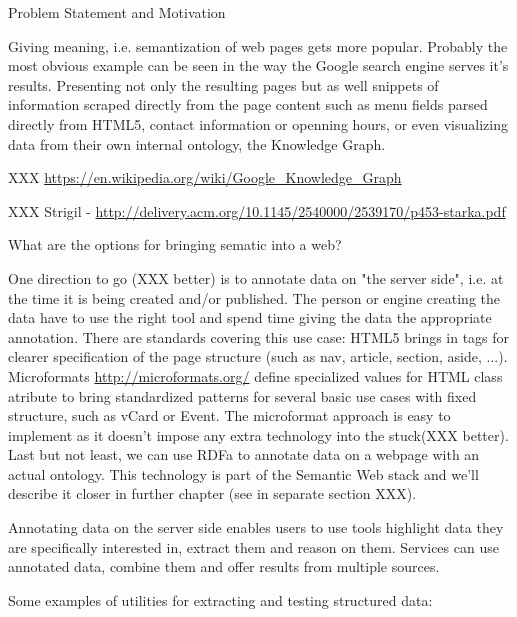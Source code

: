 \sec Problem Statement and Motivation

Giving meaning, i.e. semantization of web pages gets more popular. Probably the most
obvious example can be seen in the way the Google search engine serves it's
results. Presenting not only the resulting pages but as well snippets of
information scraped directly from the page content such as menu fields parsed
directly from HTML5, contact information or openning hours, or even visualizing
data from their own internal ontology, the Knowledge Graph. 

XXX \url{https://en.wikipedia.org/wiki/Google_Knowledge_Graph}

XXX Strigil - \url{http://delivery.acm.org/10.1145/2540000/2539170/p453-starka.pdf}

What are the options for bringing sematic into a web? 


One direction to go (XXX better) is to annotate data on "the server side", i.e. at the time
it is being created and/or published. The person or engine creating the data have to use
the right tool and spend time giving the data the appropriate annotation. There
are standards covering this use case: HTML5 brings in tags for clearer
specification of the page structure (such as nav, article, section, aside,
...). Microformats \url{http://microformats.org/} define specialized values for
HTML class atribute to bring standardized patterns for several basic use cases
with fixed structure, such as vCard or Event. The microformat approach is easy
to implement as it doesn't impose any extra technology into the stuck(XXX
better). Last but not least, we can use RDFa to annotate data on a webpage with an
actual ontology. This technology is part of the Semantic Web stack and we'll
describe it closer in further chapter (see in separate section XXX).

Annotating data on the server side enables users to use tools highlight data
they are specifically interested in, extract them and reason on them. Services
can use annotated data, combine them and offer results from multiple sources. 

Some examples of utilities for extracting and testing structured data: 

